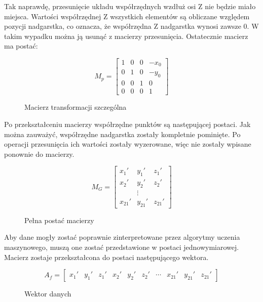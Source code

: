 \quad Tak naprawdę, przesunięcie układu współrzędnych wzdłuż osi Z nie będzie miało miejsca. Wartości współrzędnej Z wszystkich elementów są obliczane względem pozycji nadgarstka, co oznacza, że współrzędna Z nadgarstka wynosi zawsze 0. W takim wypadku można ją usunąć z macierzy przesunięcia. Ostatecznie macierz ma postać:  

\begin{figure}[H]
    \begin{equation}
        M_p = 
        \begin{bmatrix}
        1 & 0 & 0 & -x_0 \\
        0 & 1 & 0 & -y_0 \\
        0 & 0 & 1 & 0 \\
        0 & 0 & 0 & 1
        \end{bmatrix}
    \end{equation}
    \caption{Macierz transformacji szczególna}
\end{figure}

\quad Po przekształceniu macierzy współrzędne punktów są następującej postaci. Jak można zauważyć, współrzędne nadgarstka zostały kompletnie pominięte. Po operacji przesunięcia ich wartości zostały wyzerowane, więc nie zostały wpisane ponownie do macierzy. 

\begin{figure}[H]
    \begin{equation}
        M_G = 
        \begin{bmatrix}
        x_1' & y_1' & z_1' \\
        x_2' & y_2' & z_2' \\
            & \vdots &     \\
        x_{21}' & y_{21}' & z_{21}'
        \end{bmatrix}
    \end{equation}    
    \caption{Pełna postać macierzy}
\end{figure}

\quad Aby dane mogły zostać poprawnie zinterpretowane przez algorytmy uczenia maszynowego, muszą one zostać przedstawione w postaci jednowymiarowej. Macierz zostaje przekształcona do postaci następującego wektora. 

\begin{figure}[H]
    \begin{equation}
        A_f=
        \begin{bmatrix}
            x_1' & y_1' & z_1' & x_2' & y_2' & z_2' & \cdots & x_{21}' & y_{21}' & z_{21}'
        \end{bmatrix}
    \end{equation}  
    \caption{Wektor danych}
\end{figure}


